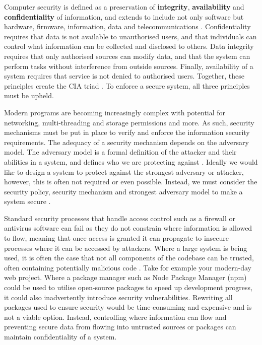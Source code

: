 \documentclass[twocolumn]{article}
\begin{document}
Computer security is defined as a preservation of \textbf{integrity}, \textbf{availability} and \textbf{confidentiality} of information, and extends to include not only software but hardware, firmware, information, data and telecommunications \cite{guttman1995introduction}.
Confidentiality requires that data is not available to unauthorised users, and that individuals can control what information can be collected and disclosed to others. Data integrity requires that only authorised sources can modify data, and that the system can perform tasks without interference from outside sources. Finally, availability of a system requires that service is not denied to authorised users. Together, these principles create the CIA triad \cite{stallings2012computer}. To enforce a secure system, all three principles must be upheld.

Modern programs are becoming increasingly complex with potential for networking, multi-threading and storage permissions and more. As such, security mechanisms must be put in place to verify and enforce the information security requirements. The adequacy of a security mechanism depends on the adversary model. The adversary model is a formal definition of the attacker and their abilities in a system, and defines who we are protecting against \cite{do2019role}. Ideally we would like to design a system to protect against the strongest adversary or attacker, however, this is often not required or even possible. Instead, we must consider the security policy, security mechanism and strongest adversary model to make a system secure \cite{balliu2014logics}.

Standard security processes that handle access control such as a firewall or antivirus software can fail as they do not constrain where information is allowed to flow, meaning that once access is granted it can propagate to insecure processes where it can be accessed by attackers. Where a large system is being used, it is often the case that not all components of the codebase can be trusted, often containing potentially malicious code \cite{sabelfeld2003language}. Take for example your modern-day web project. Where a package manager such as Node Package Manager (npm) could be used to utilise open-source packages to speed up development progress, it could also inadvertently introduce security vulnerabilities. Rewriting all packages used to ensure security would be time-consuming and expensive and is not a viable option. Instead, controlling where information can flow and preventing secure data from flowing into untrusted sources or packages can maintain confidentiality of a system.
\end{document}
